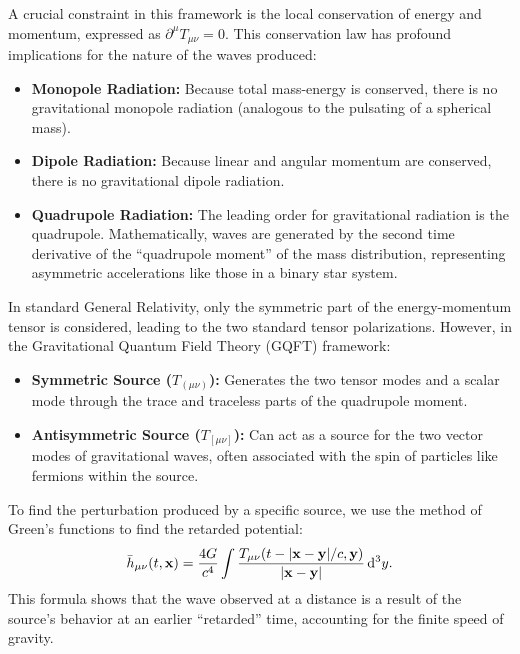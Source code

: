 A crucial constraint in this framework is the local conservation of energy and momentum, expressed as $\partial^{\mu}T_{\mu\nu} = 0$. This conservation law has profound implications for the nature of the waves produced:
\begin{itemize}
  \item \textbf{Monopole Radiation:} Because total mass-energy is conserved, there is no gravitational monopole radiation (analogous to the pulsating of a spherical mass).
  \item \textbf{Dipole Radiation:} Because linear and angular momentum are conserved, there is no gravitational dipole radiation.
  \item \textbf{Quadrupole Radiation:} The leading order for gravitational radiation is the quadrupole. Mathematically, waves are generated by the second time derivative of the ``quadrupole moment'' of the mass distribution, representing asymmetric accelerations like those in a binary star system.
\end{itemize}

In standard General Relativity, only the symmetric part of the energy-momentum tensor is considered, leading to the two standard tensor polarizations. However, in the Gravitational Quantum Field Theory (GQFT) framework:
\begin{itemize}
  \item \textbf{Symmetric Source ($T_{(\mu\nu)}$):} Generates the two tensor modes and a scalar mode through the trace and traceless parts of the quadrupole moment.
  \item \textbf{Antisymmetric Source ($T_{[\mu\nu]}$):} Can act as a source for the two vector modes of gravitational waves, often associated with the spin of particles like fermions within the source.
\end{itemize}

To find the perturbation produced by a specific source, we use the method of Green's functions to find the retarded potential:
\[%
  \bar{h}_{\mu\nu}(t, \x) = \frac{4G}{c^4} \int \frac{T_{\mu\nu}(t - |\x - \y|/c, \y)}{|\x - \y|} \dd[3]{y}
.\]%
This formula shows that the wave observed at a distance is a result of the source's behavior at an earlier ``retarded'' time, accounting for the finite speed of gravity.
